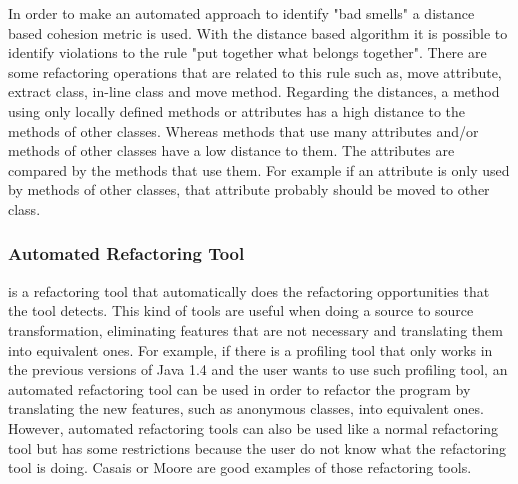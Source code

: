 In order to make an automated approach to identify "bad smells" a distance based cohesion metric is used.
With the distance based algorithm it is possible to identify violations to the rule "put together what belongs together". 
There are some refactoring operations that are related to this rule such as, move attribute, extract class, in-line class and move method. 
Regarding the distances, a method using only locally defined methods or attributes has a high distance to the methods of other classes. 
Whereas methods that use many attributes and/or methods of other classes have a low distance to them. 
The attributes are compared by the methods that use them. 
For example if an attribute is only used by methods of other classes, that attribute probably should be moved to other class.

\subsubsection{Automated Refactoring Tool}
is a refactoring tool that automatically does the refactoring opportunities that the tool detects. 
This kind of tools are useful when doing a source to source transformation, eliminating features that are not necessary and translating them into equivalent ones. 
For example, if there is a profiling tool that only works in the previous versions of Java 1.4 and the user wants to use such profiling tool, an automated refactoring tool can be used in order to refactor the program by translating the new features, such as anonymous classes, into equivalent ones.
However, automated refactoring tools can also be used like a normal refactoring tool but has some restrictions because the user do not know what the refactoring tool is doing.
Casais \cite{casais1994automatic} or Moore \cite{moore1996automatic} are good examples of those refactoring tools.



